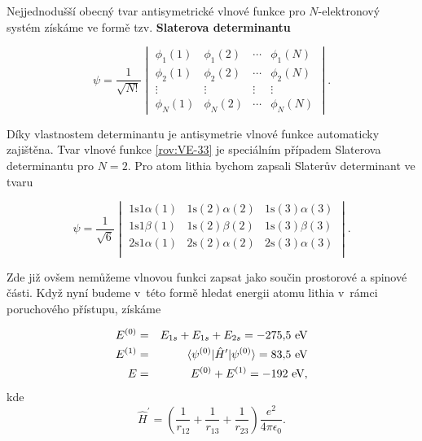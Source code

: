 Nejjednodušší obecný tvar antisymetrické vlnové funkce pro $N$-elektronový systém získáme ve formě tzv. \textbf{Slaterova determinantu}

\begin{equation}
\psi = \frac{1}{\sqrt{N!}}
\begin{vmatrix}
\phi_1(1) & \phi_1(2) & \cdots & \phi_1(N) \\
\phi_2(1) & \phi_2(2) & \cdots & \phi_2(N) \\
\vdots & \vdots & \vdots & \vdots \\
\phi_N(1) & \phi_N (2) & \cdots & \phi_N(N)
\end{vmatrix}.
\label{rov:VE-37}
\end{equation}

\noindent Díky vlastnostem determinantu je antisymetrie vlnové funkce automaticky zajištěna. Tvar vlnové funkce \eqref{rov:VE-33} je speciálním případem Slaterova determinantu pro $N=2$. Pro atom lithia bychom zapsali Slaterův determinant ve tvaru

\begin{equation}
\psi = \frac{1}{\sqrt{6}}
\begin{vmatrix}
1 \mathrm{s}1 \alpha(1) & 1 \mathrm{s}(2) \alpha (2) & 1 \mathrm{s}(3) \alpha (3) \\
1 \mathrm{s}1 \beta(1) & 1 \mathrm{s}(2) \beta (2) & 1 \mathrm{s}(3) \beta (3) \\
2 \mathrm{s}1 \alpha(1) & 2 \mathrm{s}(2) \alpha (2) & 2 \mathrm{s}(3) \alpha (3) \\
\end{vmatrix}.
\label{rov:VE-38}
\end{equation}


\noindent Zde již ovšem nemůžeme vlnovou funkci zapsat jako součin prostorové a spinové části. Když nyní budeme v~této formě hledat energii atomu lithia v~rámci poruchového přístupu, získáme

\begin{eqnarray*}
E^{(0)} &=& E_{1s} + E_{1s} + E_{2s} = -275{,}5 \mbox{ eV} \\
E^{(1)} &=& \braket{\psi^{(0)}|\hat{H}^{\prime}|\psi^{(0)}} = 83{,}5 \mbox{ eV}\\
E &=& E^{(0)} + E^{(1)} = -192 \mbox{ eV},
\end{eqnarray*}
kde
\begin{equation}
\hat{H}^{\prime} = \left( \frac{1}{r_{12}} + \frac{1}{r_{13}} + \frac{1}{r_{23}} \right) \frac{e^2}{4 \pi \epsilon_0}.  \nonumber
\end{equation}

